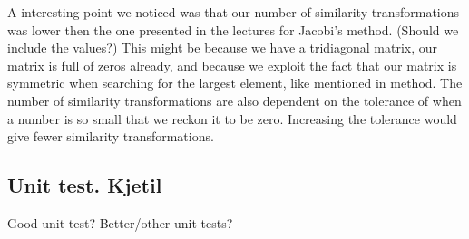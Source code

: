 A interesting point we noticed was that our number of similarity transformations was lower then the one presented in the lectures for Jacobi's method.  (Should we include the values?) This might be because we have a tridiagonal matrix, our matrix is full of zeros already, and because we exploit the fact that our matrix is symmetric when searching for the largest element, like mentioned in method. The number of similarity transformations are also dependent on the tolerance of when a number is so small that we reckon it to be zero. Increasing the tolerance would give fewer similarity transformations. 
\subsection{Unit test. Kjetil}

Good unit test? Better/other unit tests?

